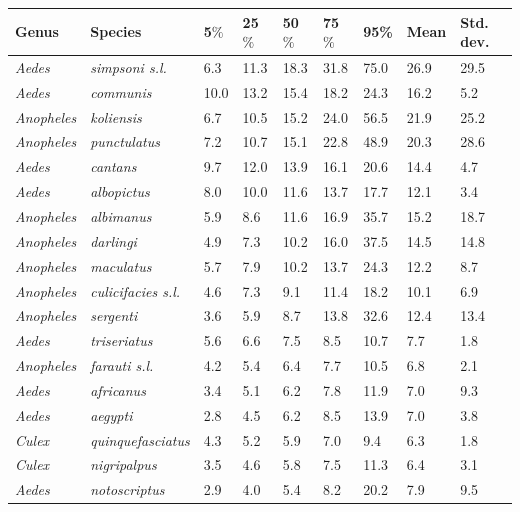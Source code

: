 \documentclass[12pt]{article}
\begin{document}
{\begin{table}[htbp]
\begin{tabular}{l|l|l|l|l|l|l|l|l}
	\textbf{Genus} & \textbf{Species} & \textbf{5$\%$} & \textbf{25$\%$} & \textbf{50$\%$} & \textbf{75$\%$} & \textbf{95\%} &  \textbf{Mean} & \textbf{Std. dev.}\\
		\hline
 \textit{Aedes} & \textit{simpsoni s.l.} & 6.3 & 11.3 & 18.3 & 31.8 & 75.0 & 26.9 & 29.5 \\
\textit{Aedes} & \textit{communis} & 10.0 & 13.2 & 15.4 & 18.2 & 24.3 & 16.2 & 5.2 \\
\textit{Anopheles} & \textit{koliensis} & 6.7 & 10.5 & 15.2 & 24.0 & 56.5 & 21.9 & 25.2 \\
\textit{Anopheles} & \textit{punctulatus} & 7.2 & 10.7 & 15.1 & 22.8 & 48.9 & 20.3 & 28.6 \\
\textit{Aedes} & \textit{cantans} & 9.7 & 12.0 & 13.9 & 16.1 & 20.6 & 14.4 & 4.7 \\
\textit{Aedes} & \textit{albopictus} & 8.0 & 10.0 & 11.6 & 13.7 & 17.7 & 12.1 & 3.4 \\
\textit{Anopheles} & \textit{albimanus} & 5.9 & 8.6 & 11.6 & 16.9 & 35.7 & 15.2 & 18.7 \\
\textit{Anopheles} & \textit{darlingi} & 4.9 & 7.3 & 10.2 & 16.0 & 37.5 & 14.5 & 14.8 \\
\textit{Anopheles} & \textit{maculatus} & 5.7 & 7.9 & 10.2 & 13.7 & 24.3 & 12.2 & 8.7 \\
\textit{Anopheles} & \textit{culicifacies s.l.} & 4.6 & 7.3 & 9.1 & 11.4 & 18.2 & 10.1 & 6.9 \\
\textit{Anopheles} & \textit{sergenti} & 3.6 & 5.9 & 8.7 & 13.8 & 32.6 & 12.4 & 13.4 \\
\textit{Aedes} & \textit{triseriatus} & 5.6 & 6.6 & 7.5 & 8.5 & 10.7 & 7.7 & 1.8 \\
\textit{Anopheles} & \textit{farauti s.l.} & 4.2 & 5.4 & 6.4 & 7.7 & 10.5 & 6.8 & 2.1 \\
\textit{Aedes} & \textit{africanus} & 3.4 & 5.1 & 6.2 & 7.8 & 11.9 & 7.0 & 9.3 \\
\textit{Aedes} & \textit{aegypti} & 2.8 & 4.5 & 6.2 & 8.5 & 13.9 & 7.0 & 3.8 \\
\textit{Culex} & \textit{quinquefasciatus} & 4.3 & 5.2 & 5.9 & 7.0 & 9.4 & 6.3 & 1.8 \\
\textit{Culex} & \textit{nigripalpus} & 3.5 & 4.6 & 5.8 & 7.5 & 11.3 & 6.4 & 3.1 \\
\textit{Aedes} & \textit{notoscriptus} & 2.9 & 4.0 & 5.4 & 8.2 & 20.2 & 7.9 & 9.5 \\

\end{tabular}
\end{table}}
\end{document}
